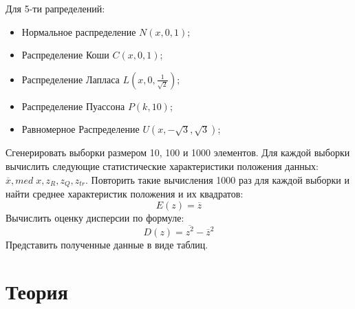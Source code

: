 \documentclass[12pt,a4paper]{article}
\begin{document}
	Для 5-ти рапределений:
	\begin{itemize}
		\item Нормальное распределение $N(x,0,1)$;
		\item Распределение Коши $C(x,0,1)$;
		\item Распределение Лапласа $L( x,0,\frac{1}{\sqrt{2}})$;
		\item Распределение Пуассона $P(k, 10)$;
		\item Равномерное Распределение $U(x,-\sqrt{3}, \sqrt{3})$;
	\end{itemize}
	Сгенерировать выборки размером 10, 100 и 1000 элементов. Для каждой выборки вычислить следующие статистические характеристики положения данных: $\overline{x}, med\;x, z_R, z_Q, z_{tr}$. Повторить такие вычисления 1000 раз для каждой выборки и найти среднее характеристик положения и их квадратов:
	\begin{equation}\label{eqn:expected_value}
	E(z)=\overline{z}
	\end{equation}
	Вычислить оценку дисперсии по формуле:
	\begin{equation}\label{eqn:variance}
	D(z)=\overline{z^2}-\overline{z}^2
	\end{equation}
	Представить полученные данные в виде таблиц.
	
	\section{Теория}
\end{document}
